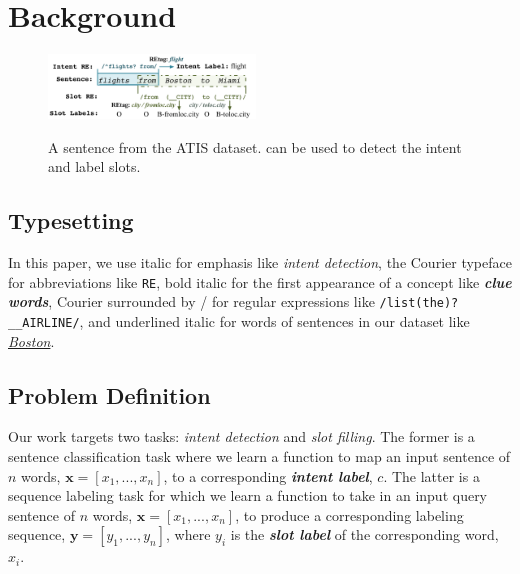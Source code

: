 \section{Background}
\begin{figure}[t!]
  \centering
  \includegraphics[width=0.49\textwidth]{figure/motivation.pdf}\\
  \vspace{-3mm}
  \caption{A sentence from the ATIS dataset. \REs can be used to detect the intent and label slots.}
  \label{atis_sample}
  \vspace{-3mm}
\end{figure}

\vspace{-1mm}
\subsection{Typesetting}
\vspace{-1mm} In this paper, we use italic for emphasis like \emph{intent detection}, the Courier typeface for abbreviations like
\texttt{RE}, bold italic for the first appearance of a concept like \emph{\textbf{clue words}}, Courier surrounded by / for regular
expressions like {\small \texttt{/list(\;the)?\;\_\_AIRLINE/}}, and underlined italic for words of sentences in our dataset like
\underline{\textit{Boston}}.


\vspace{-1mm}
\subsection{Problem Definition}
\vspace{-1mm}
Our work targets two \SLU tasks: \emph{intent detection} and \emph{slot filling}. The former is a sentence classification task where we
learn a function to map an input sentence of $n$ words, $\textbf{x}=[x_{1}, ..., x_{n}]$, to a corresponding \textbf{\emph{intent label}},
$c$. The latter is a sequence labeling task for which we learn a function to take in an input query sentence of $n$ words,
$\textbf{x}=[x_{1}, ..., x_{n}]$, to produce a corresponding labeling sequence, $\textbf{y}=[y_{1}, ..., y_{n}]$, where  $y_i$ is the
\textbf{\emph{slot label}} of the
corresponding word, $x_i$. %


